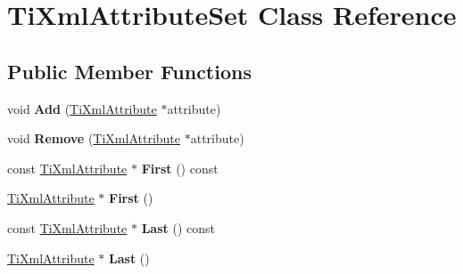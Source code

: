 \hypertarget{class_ti_xml_attribute_set}{
\section{\-Ti\-Xml\-Attribute\-Set \-Class \-Reference}
\label{class_ti_xml_attribute_set}
}
\subsection*{\-Public \-Member \-Functions}
\begin{DoxyCompactItemize}
\item 
\hypertarget{class_ti_xml_attribute_set_a745e50ddaae3bee93e4589321e0b9c1a}{
void {\bfseries \-Add} (\hyperlink{class_ti_xml_attribute}{\-Ti\-Xml\-Attribute} $\ast$attribute)}
\label{class_ti_xml_attribute_set_a745e50ddaae3bee93e4589321e0b9c1a}

\item 
\hypertarget{class_ti_xml_attribute_set_a924a73d071f2573f9060f0be57879c57}{
void {\bfseries \-Remove} (\hyperlink{class_ti_xml_attribute}{\-Ti\-Xml\-Attribute} $\ast$attribute)}
\label{class_ti_xml_attribute_set_a924a73d071f2573f9060f0be57879c57}

\item 
\hypertarget{class_ti_xml_attribute_set_ae0636e88cedd4b09d61c451860f68598}{
const \hyperlink{class_ti_xml_attribute}{\-Ti\-Xml\-Attribute} $\ast$ {\bfseries \-First} () const }
\label{class_ti_xml_attribute_set_ae0636e88cedd4b09d61c451860f68598}

\item 
\hypertarget{class_ti_xml_attribute_set_a99703bb08ca2aece2d7ef835de339ba0}{
\hyperlink{class_ti_xml_attribute}{\-Ti\-Xml\-Attribute} $\ast$ {\bfseries \-First} ()}
\label{class_ti_xml_attribute_set_a99703bb08ca2aece2d7ef835de339ba0}

\item 
\hypertarget{class_ti_xml_attribute_set_a7b3f3ccf39a97bc25539d3fcc540296a}{
const \hyperlink{class_ti_xml_attribute}{\-Ti\-Xml\-Attribute} $\ast$ {\bfseries \-Last} () const }
\label{class_ti_xml_attribute_set_a7b3f3ccf39a97bc25539d3fcc540296a}

\item 
\hypertarget{class_ti_xml_attribute_set_ab4c4edfb2d74f6ea31aae096743bd6e0}{
\hyperlink{class_ti_xml_attribute}{\-Ti\-Xml\-Attribute} $\ast$ {\bfseries \-Last} ()}
\label{class_ti_xml_attribute_set_ab4c4edfb2d74f6ea31aae096743bd6e0}


\end{DoxyCompactItemize}

